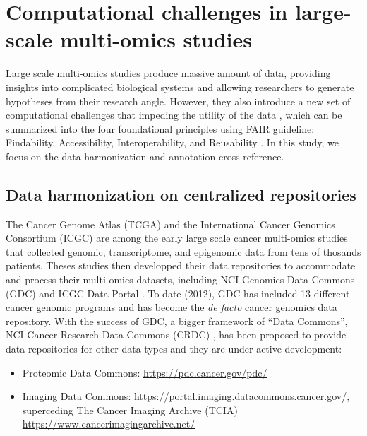 


\section{Computational challenges in large-scale multi-omics studies}
Large scale multi-omics studies produce massive amount of data, providing insights into complicated biological systems and allowing researchers to generate hypotheses from their research angle. However, they also introduce a new set of computational challenges that impeding the utility of the data \cite{marxv_marxv:DrillingBig2013,deanda-jaureguig_hernandez-lemuse:ComputationalOncology2020}, which can be summarized into the four foundational principles using FAIR guideline: Findability, Accessibility, Interoperability, and Reusability \cite{wilkinsonmd_monsb:FAIRGuiding2016}. In this study, we focus on the data harmonization and annotation cross-reference.


\subsection{Data harmonization on centralized repositories}
The Cancer Genome Atlas (TCGA) \cite{hutterc_zenklusenjc:CancerGenome2018} and the International Cancer Genomics Consortium (ICGC) \cite{internationalcancergenomeconsortium_yangh:InternationalNetwork2010} are among the early large scale cancer multi-omics studies that collected genomic, transcriptome, and epigenomic data from tens of thosands patients. Theses studies then developped their data repositories to accommodate and process their multi-omics datasets, including NCI Genomics Data Commons (GDC)\footnotemark{} \cite{heathap_grossmanrl:NCIGenomic2021} and ICGC Data Portal \cite{jolyy_chalmersd:DataSharing2012}. To date (2012), GDC has included 13 different cancer genomic programs and has become the \textit{de facto} cancer genomics data repository. With the success of GDC, a bigger framework of ``Data Commons'', NCI Cancer Research Data Commons (CRDC) \cite{hinksoniv_kibbewa:ComprehensiveInfrastructure2017}, has been proposed to provide data repositories for other data types and they are under active development:
\begin{itemize}
    \item Proteomic Data Commons: \url{https://pdc.cancer.gov/pdc/}
    \item Imaging Data Commons: \url{https://portal.imaging.datacommons.cancer.gov/}, superceding The Cancer Imaging Archive (TCIA) \url{https://www.cancerimagingarchive.net/}
\end{itemize}

